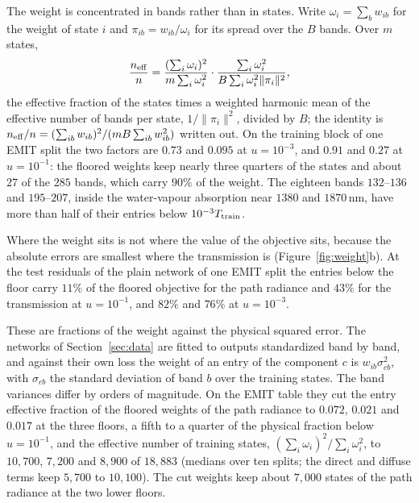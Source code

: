 \documentclass[11pt]{article}
\theoremstyle{remark}
\newcommand{\1}{\mathbf{1}}
\begin{document}
The weight is concentrated in bands rather than in states. Write $\omega_i=\sum_bw_{ib}$ for the weight of state $i$ and
$\pi_{ib}=w_{ib}/\omega_i$ for its spread over the $B$ bands. Over $m$ states,
\[
\frac{n_{\rm eff}}{n}=\frac{(\sum_i\omega_i)^2}{m\sum_i\omega_i^2}\cdot\frac{\sum_i\omega_i^2}{B\sum_i\omega_i^2\|\pi_i\|^2},
\]
the effective fraction of the states times a weighted harmonic mean of the effective number of bands per state,
$1/\|\pi_i\|^2$, divided by $B$; the identity is $n_{\rm eff}/n=(\sum_{ib}w_{ib})^2/(mB\sum_{ib}w_{ib}^2)$ written out. On
the training block of one EMIT split the two factors are $0.73$ and $0.095$ at $u=10^{-3}$, and $0.91$ and $0.27$ at
$u=10^{-1}$: the floored weights keep nearly three quarters of the states and about $27$ of the $285$ bands, which
carry $90\%$ of the weight. The eighteen bands $132$--$136$ and $195$--$207$, inside the water-vapour absorption near
$1380$ and $1870$\,nm, have more than half of their entries below $10^{-3}T_{\rm train}$.

Where the weight sits is not where the value of the objective sits, because the absolute errors are smallest where
the transmission is (Figure~\ref{fig:weight}b). At the test residuals of the plain network of one EMIT split the
entries below the floor carry $11\%$ of the floored objective for the path radiance and $43\%$ for the transmission at
$u=10^{-1}$, and $82\%$ and $76\%$ at $u=10^{-3}$.

These are fractions of the weight against the physical squared error. The networks of Section~\ref{sec:data} are
fitted to outputs standardized band by band, and against their own loss the weight of an entry of the component $c$ is
$w_{ib}\sigma_{cb}^2$, with $\sigma_{cb}$ the standard deviation of band $b$ over the training states. The band
variances differ by orders of magnitude. On the EMIT table they cut the entry effective fraction of the floored
weights of the path radiance to $0.072$, $0.021$ and $0.017$ at the three floors, a fifth to a quarter of the physical
fraction below $u=10^{-1}$, and the effective number of training states, $(\sum_i\omega_i)^2/\sum_i\omega_i^2$, to
$10{,}700$, $7{,}200$ and $8{,}900$ of $18{,}883$ (medians over ten splits; the direct and diffuse terms keep $5{,}700$
to $10{,}100$). The cut weights keep about $7{,}000$ states of the path radiance at the two lower floors.
\end{document}
